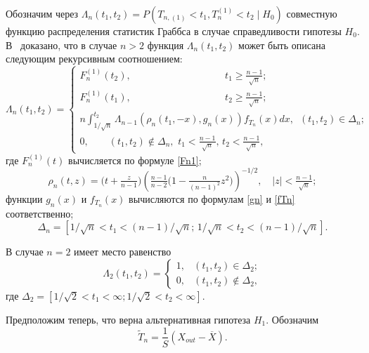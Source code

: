 Обозначим через $\Lambda_{n}(t_1,t_2)=P(T_{n,(1)}<t_1, T_{n}^{(1)}<t_2\mid H_0)$ совместную функцию распределения  статистик Граббса в случае справедливости гипотезы $H_0$. 
В~\cite{ShirIZVUZ2014} доказано, что в случае $n>2$ функция $\Lambda_{n}(t_1,t_2)$ может быть описана следующим рекурсивным соотношением:
\begin{equation}\label{Lambda_n}
\Lambda_n(t_1,t_2)= \left\{
\begin{array}{r}
F_n^{(1)}(t_2),\hspace{4cm}  t_1\ge\frac{n-1}{\sqrt{n}}; \\
F_n^{(1)}(t_1),\hspace{4cm}  t_2\ge\frac{n-1}{\sqrt{n}};\\
\displaystyle
n\int ^{t_2}_{{1}/{\sqrt{n}}}\Lambda_{n-1} 
\left(\rho_{n}(t_1,-x),g_{n}(x)\right)f_{T_n}(x)dx,\,\,\,(t_1,t_2)\in\Delta_n;\\
0, \qquad  (t_1,t_2)\notin\Delta_n,\,\,
t_1<\frac{n-1}{\sqrt{n}},\,t_2<\frac{n-1}{\sqrt{n}},
\end{array}
\right.
\end{equation} 
где $F_n^{(1)}(t)$
вычисляется по формуле \eqref{Fn1};
\begin{equation}
\label{rhon} 
\rho_n(t,z)=\bigl(t+\tfrac{z}{n-1}\bigr)  
\left( \tfrac{n-1}{n-2}\bigl(1-\tfrac{n}{(n-1)^2}z^2\bigr) \right)^{-1/2}, \quad 
|z|<\tfrac{n-1}{\sqrt{n}};
\end{equation}
функции $g_n(x)$ и  $f_{T_n}(x)$ вычисляются по формулам \eqref{gn} и \eqref{fTn} соответственно;
\begin{equation}
\label{Deltan}
\Delta_n=\left[1/\sqrt{n}<t_1<(n-1)/\sqrt{n};\,1/\sqrt{n}<t_2<(n-1)/\sqrt{n}
\right].
\end{equation}

В случае  $n=2$ имеет место равенство \cite{ShirIZVUZ2014}
\begin{equation*}\label{Lambda_2}
\Lambda_2(t_1,t_2)= \left\{
\begin{array}{cl}
1, &(t_1,t_2)\in \Delta_2;\\
0, &(t_1,t_2)\notin \Delta_2,
\end{array}
\right.
\end{equation*}
где $\Delta_2=[1/{\sqrt{2}}<t_1<\infty;1/{\sqrt{2}}<t_2<\infty]$.

Предположим  теперь, что  верна альтернативная гипотеза $H_1$.
Обозначим
\begin{equation*}
\label{Tilda}
\widetilde{T}_{n}= \frac1S(X_{out}-\overline{X}).
\end{equation*}

